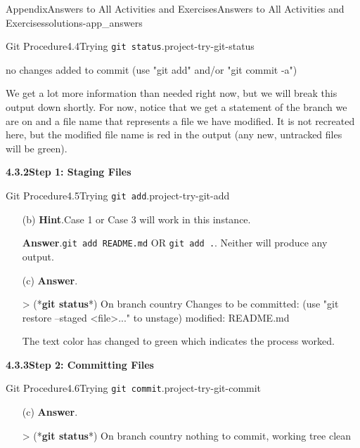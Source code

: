 \documentclass[oneside,10pt,]{book}
\newcommand{\blocktitlefont}{\relax}
\newcommand{\mono}[1]{\texttt{#1}}
\newcommand{\consoleinput}[1]{\textbf{#1}}
\begin{document}
\begin{solutions-chapter}{Appendix}{Answers to All Activities and Exercises}{}{Answers to All Activities and Exercises}{}{}{solutions-app_answers}
\begin{projectsolution}{Git Procedure}{4.4}{Trying \mono{git status}.}{project-try-git-status}
\begin{console}{0}{1}{0}
no changes added to commit (use "git add" and/or "git commit -a")
\end{console}
We get a lot more information than needed right now, but we will break this output down shortly. For now, notice that we get a statement of the branch we are on and a file name that represents a file we have modified. It is not recreated here, but the modified file name is red in the output (any new, untracked files will be green).%
\end{projectsolution}%
\par\medskip
\noindent\textbf{\Large{}4.3.2\space\textperiodcentered\space{}Step 1: Staging Files}
\begin{projectsolution}{Git Procedure}{4.5}{Trying \mono{git add}.}{project-try-git-add}%
\begin{enumerate}[font=\bfseries,label=(\alph*),ref=\alph*]%
\item[(b)]\noindent\textbf{\blocktitlefont Hint}.\hypertarget{hint-try-git-add-d-b-back}{}\quad{}Case 1 or Case 3 will work in this instance.%
\par\smallskip%
\noindent\textbf{\blocktitlefont Answer}.\hypertarget{answer-try-git-add-d-c-back}{}\quad{}\mono{git add README.md} OR \mono{git add .}. Neither will produce any output.%
\item[(c)]\noindent\textbf{\blocktitlefont Answer}.\hypertarget{answer-try-git-add-e-b-back}{}\quad{}\begin{console}{0}{1}{0}
> (*\consoleinput{git status}*)
On branch country
Changes to be committed:
  (use "git restore --staged <file>..." to unstage)
        modified:   README.md
\end{console}
The text color has changed to green which indicates the process worked.%
\end{enumerate}%
\end{projectsolution}%
\par\medskip
\noindent\textbf{\Large{}4.3.3\space\textperiodcentered\space{}Step 2: Committing Files}
\begin{projectsolution}{Git Procedure}{4.6}{Trying \mono{git commit}.}{project-try-git-commit}%
\begin{enumerate}[font=\bfseries,label=(\alph*),ref=\alph*]%
\item[(c)]\noindent\textbf{\blocktitlefont Answer}.\hypertarget{answer-try-git-commit-e-b-back}{}\quad{}\begin{console}{0}{1}{0}
> (*\consoleinput{git status}*)
On branch country
nothing to commit, working tree clean
\end{console}

\end{enumerate}
\end{projectsolution}
\end{solutions-chapter}
\end{document}
